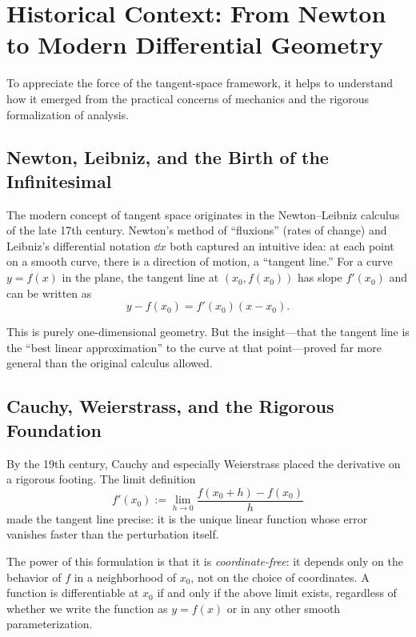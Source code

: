 \section{Historical Context: From Newton to Modern Differential Geometry}

To appreciate the force of the tangent-space framework, it helps to understand how it emerged
from the practical concerns of mechanics and the rigorous formalization of analysis.

\subsection{Newton, Leibniz, and the Birth of the Infinitesimal}

The modern concept of tangent space originates in the Newton--Leibniz calculus of the late
17th century. Newton's method of ``fluxions'' (rates of change) and Leibniz's differential
notation $\dd x$ both captured an intuitive idea: at each point on a smooth curve, there is
a direction of motion, a ``tangent line.'' For a curve $y = f(x)$ in the plane, the tangent
line at $(x_0, f(x_0))$ has slope $f'(x_0)$ and can be written as
\begin{equation}
y - f(x_0) = f'(x_0)(x - x_0).
\label{eq:ch1:tangent-line}
\end{equation}

This is purely one-dimensional geometry. But the insight---that the tangent line is the
``best linear approximation'' to the curve at that point---proved far more general than
the original calculus allowed.

\subsection{Cauchy, Weierstrass, and the Rigorous Foundation}

By the 19th century, Cauchy and especially Weierstrass placed the derivative on a rigorous
footing. The limit definition
\begin{equation}
f'(x_0) := \lim_{h \to 0} \frac{f(x_0 + h) - f(x_0)}{h}
\label{eq:ch1:derivative-limit}
\end{equation}
made the tangent line precise: it is the unique linear function whose error vanishes faster
than the perturbation itself.

The power of this formulation is that it is \emph{coordinate-free}: it depends only on the
behavior of $f$ in a neighborhood of $x_0$, not on the choice of coordinates. A function is
differentiable at $x_0$ if and only if the above limit exists, regardless of whether we
write the function as $y = f(x)$ or in any other smooth parameterization.

